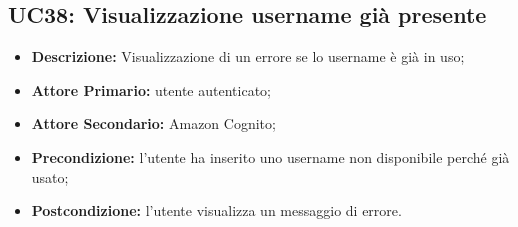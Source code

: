 \subsection{UC38: Visualizzazione username già presente}
\label{sec:UC38}
\begin{itemize}
    \item \textbf{Descrizione:} Visualizzazione di un errore se lo username è già in uso;
    \item \textbf{Attore Primario:} utente autenticato;
    \item \textbf{Attore Secondario:} Amazon Cognito;
    \item \textbf{Precondizione:} l'utente ha inserito uno username non disponibile perché già usato;
    \item \textbf{Postcondizione:} l'utente visualizza un messaggio di errore.
\end{itemize}

